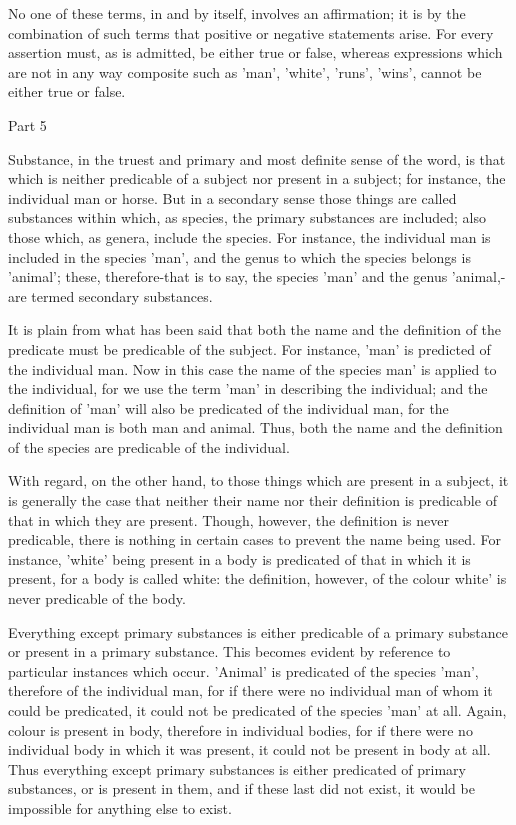 No one of these terms, in and by itself, involves an affirmation; it is
by the combination of such terms that positive or negative statements
arise. For every assertion must, as is admitted, be either true or
false, whereas expressions which are not in any way composite such as
'man', 'white', 'runs', 'wins', cannot be either true or false.



Part 5

Substance, in the truest and primary and most definite sense of the
word, is that which is neither predicable of a subject nor present in a
subject; for instance, the individual man or horse. But in a secondary
sense those things are called substances within which, as species, the
primary substances are included; also those which, as genera, include
the species. For instance, the individual man is included in the
species 'man', and the genus to which the species belongs is 'animal';
these, therefore-that is to say, the species 'man' and the genus
'animal,-are termed secondary substances.

It is plain from what has been said that both the name and the
definition of the predicate must be predicable of the subject. For
instance, 'man' is predicted of the individual man. Now in this case
the name of the species man' is applied to the individual, for we use
the term 'man' in describing the individual; and the definition of
'man' will also be predicated of the individual man, for the individual
man is both man and animal. Thus, both the name and the definition of
the species are predicable of the individual.

With regard, on the other hand, to those things which are present in a
subject, it is generally the case that neither their name nor their
definition is predicable of that in which they are present. Though,
however, the definition is never predicable, there is nothing in
certain cases to prevent the name being used. For instance, 'white'
being present in a body is predicated of that in which it is present,
for a body is called white: the definition, however, of the colour
white' is never predicable of the body.

Everything except primary substances is either predicable of a primary
substance or present in a primary substance. This becomes evident by
reference to particular instances which occur. 'Animal' is predicated
of the species 'man', therefore of the individual man, for if there
were no individual man of whom it could be predicated, it could not be
predicated of the species 'man' at all. Again, colour is present in
body, therefore in individual bodies, for if there were no individual
body in which it was present, it could not be present in body at all.
Thus everything except primary substances is either predicated of
primary substances, or is present in them, and if these last did not
exist, it would be impossible for anything else to exist.

